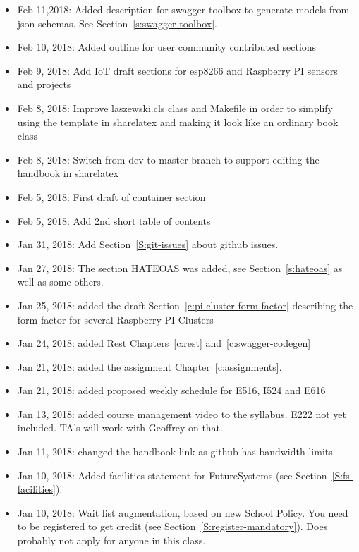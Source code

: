 \begin{itemize}
\item Feb 11,2018: Added description for swagger toolbox to generate
  models from json schemas. See Section~\ref{s:swagger-toolbox}.
\item Feb 10, 2018: Added outline for user community contributed
  sections
\item Feb 9, 2018: Add IoT draft sections for esp8266 and Raspberry PI
  sensors and projects
\item Feb 8, 2018: Improve laszewski.cls class and Makefile in order
  to simplify using the template in sharelatex and making it look like
  an ordinary book class
\item Feb 8, 2018: Switch from dev to master branch to support editing
  the handbook in sharelatex
\item Feb 5, 2018: First draft of container section
\item Feb 5, 2018: Add 2nd short table of contents
\item Jan 31, 2018: Add Section~\ref{S:git-issues} about github issues.
\item Jan 27, 2018: The section HATEOAS was added, see
  Section~\ref{s:hateoas} as well as some others.
\item Jan 25, 2018: added the draft
  Section~\ref{c:pi-cluster-form-factor} describing the form factor
  for several Raspberry PI Clusters

\item Jan 24, 2018: added Rest Chapters~\ref{c:rest}
  and~\ref{c:swagger-codegen}
 
\item Jan 21, 2018: added the assignment Chapter~\ref{c:assignments}.

\item Jan 21, 2018: added proposed weekly schedule for E516, I524 and
  E616

\item Jan 13, 2018: added course management video to the
  syllabus. E222 not yet included. TA's will work with Geoffrey on
  that.

\item Jan 11, 2018: changed the handbook link as github has bandwidth
  limits

\item Jan 10, 2018: Added facilities statement for FutureSystems (see
  Section~\ref{S:fs-facilities}).

\item Jan 10, 2018: Wait list augmentation, based on new School
  Policy. You need to be registered to get credit (see
  Section~\ref{S:register-mandatory}). Does probably not apply for
  anyone in this class.

\end{itemize}
